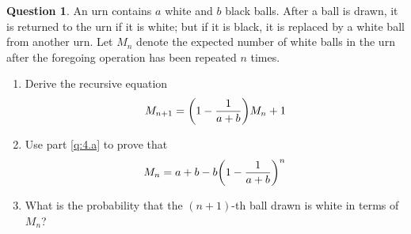 \documentclass[utf8]{article}
\theoremstyle{definition}%
\newtheorem{question}{Question} %
\theoremstyle{plain}%
\begin{document}
\begin{question}
    An urn contains $a$ white and $b$ black balls. After a ball is drawn, it is returned to the urn if it is white; but if it is black, it is replaced by a white ball from another urn. Let $M_n$ denote the expected number of white balls in the urn after the foregoing operation has been repeated $n$ times.
    \begin{enumerate}[label=(\alph*)]
        \item \label{q:4.a} Derive the recursive equation
        \begin{equation}
            M_{n+1} = \qty(1 - \frac{1}{a + b}) M_n + 1
        \end{equation}
        \item Use part \ref{q:4.a} to prove that
        \begin{equation}
            M_n = a + b - b \qty(1 - \frac{1}{a + b})^n
        \end{equation}
        \item What is the probability that the $(n + 1)$-th ball drawn is white in terms of $M_n$?
    \end{enumerate}
\end{question}
\end{document}
